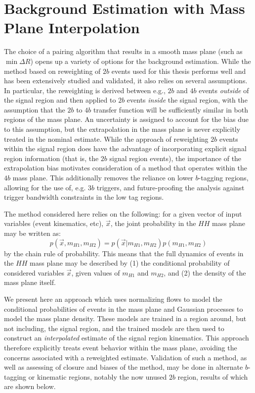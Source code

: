 \section{Background Estimation with Mass Plane Interpolation}
The choice of a pairing algorithm that results in a smooth mass plane (such as $\min{\Delta R}$) 
opens up a variety of options for the background estimation. While the method based on 
reweighting of $2b$ events used for this thesis performs well and has been extensively 
studied and validated, it also relies on several assumptions. In particular, the reweighting is derived 
between e.g., $2b$ and $4b$ events \emph{outside} of the signal region and then applied to $2b$ 
events \emph{inside} the signal region, with the assumption that the $2b$ to $4b$ transfer function 
will be sufficiently similar in both regions of the mass plane. An uncertainty is assigned to 
account for the bias due to this assumption, but the extrapolation in the mass plane is never 
explicitly treated in the nominal estimate. While the approach of reweighting $2b$ events within the 
signal region does have the advantage of incorporating explicit signal region information (that is, 
the $2b$ signal region events), the importance of the extrapolation bias motivates consideration 
of a method that operates within the $4b$ mass plane. This additionally removes the reliance on lower 
$b$-tagging regions, allowing for the use of, e.g. $3b$ triggers, and future-proofing the analysis 
against trigger bandwidth constraints in the low tag regions.

The method considered here relies on the following: for a given vector of 
input variables (event kinematics, etc), $\vec{x}$, the joint probability in the $HH$ mass 
plane may be written as:
\begin{equation}
p(\vec{x}, m_{H1}, m_{H2}) = p(\vec{x}| m_{H1}, m_{H2})p(m_{H1}, m_{H2})
\end{equation}
by the chain rule of probability. This means that the full dynamics of events 
in the $HH$ mass plane may be described by (1) the conditional probability of 
considered variables $\vec{x}$, given values of $m_{H1}$ and $m_{H2}$, and (2) the 
density of the mass plane itself. 

We present here an approach which uses normalizing flows  to model the 
conditional probabilities of events in the mass plane and Gaussian processes to 
model the mass plane density. These models are trained in a region around, but not 
including, the signal region, and the trained models are then used to construct an 
\emph{interpolated} estimate of the signal region kinematics. This approach therefore 
explicitly treats event behavior within the mass plane, avoiding the concerns associated 
with a reweighted estimate. Validation of such a method, as well as assessing of closure and 
biases of the method, may be done in alternate $b$-tagging or kinematic regions, notably the 
now unused $2b$ region, results of which are shown below.

